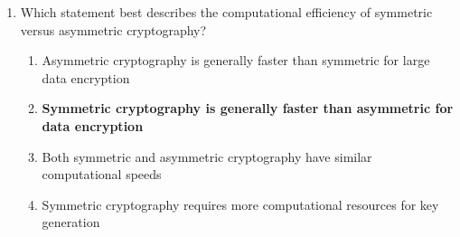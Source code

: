 \begin{enumerate}
    \item Which statement best describes the computational efficiency of
          symmetric versus asymmetric cryptography?
    \begin{enumerate}
        \item Asymmetric cryptography is generally faster than symmetric for
              large data encryption
        \item \textbf{Symmetric cryptography is generally faster than asymmetric
              for data encryption}
        \item Both symmetric and asymmetric cryptography have similar
              computational speeds
        \item Symmetric cryptography requires more computational resources for
              key generation
    \end{enumerate}
\end{enumerate}


